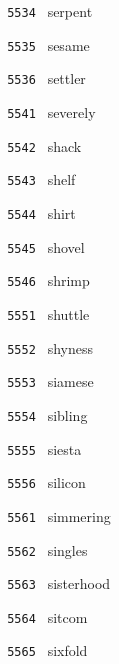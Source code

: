 \documentclass[11pt]{article}
\begin{document}
\begin{multicols}{6}
\noindent \texttt{ 5534 } \hspace{1mm} serpent  \par
\noindent \texttt{ 5535 } \hspace{1mm} sesame  \par
\noindent \texttt{ 5536 } \hspace{1mm} settler  \par
\noindent \texttt{ 5541 } \hspace{1mm} severely  \par
\noindent \texttt{ 5542 } \hspace{1mm} shack  \par
\noindent \texttt{ 5543 } \hspace{1mm} shelf  \par
\noindent \texttt{ 5544 } \hspace{1mm} shirt  \par
\noindent \texttt{ 5545 } \hspace{1mm} shovel  \par
\noindent \texttt{ 5546 } \hspace{1mm} shrimp  \par
\noindent \texttt{ 5551 } \hspace{1mm} shuttle  \par
\noindent \texttt{ 5552 } \hspace{1mm} shyness  \par
\noindent \texttt{ 5553 } \hspace{1mm} siamese  \par
\noindent \texttt{ 5554 } \hspace{1mm} sibling  \par
\noindent \texttt{ 5555 } \hspace{1mm} siesta  \par
\noindent \texttt{ 5556 } \hspace{1mm} silicon  \par
\noindent \texttt{ 5561 } \hspace{1mm} simmering  \par
\noindent \texttt{ 5562 } \hspace{1mm} singles  \par
\noindent \texttt{ 5563 } \hspace{1mm} sisterhood  \par
\noindent \texttt{ 5564 } \hspace{1mm} sitcom  \par
\noindent \texttt{ 5565 } \hspace{1mm} sixfold  \par

\end{multicols}
\end{document}
